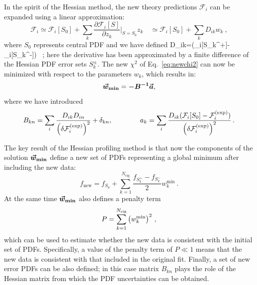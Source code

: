 In the spirit of the Hessian method, the new theory predictions $\mathcal{F}_i$ can be expanded
using a linear approximation:
\begin{equation}
\mathcal{F}_i \simeq \mathcal{F}_i[S_0] + \sum_k \frac{\partial\mathcal{F}_i[S]}{\partial z_k}\bigg|_{S=S_0} z_k \quad
              \simeq \mathcal{F}_i[S_0] + \sum_k D_{ik} w_k \ ,
\end{equation}
where $S_0$ represents central PDF and we have defined
\be
D_{ik}=(_i[S_k^+]-_i[S_k^-]) \, ;
\ee
here the  derivative has been approximated by a finite difference of the 
Hessian PDF error sets $S_k^{\pm}$.
%
The new $\chi^2$ of Eq.~\eqref{eq:newchi2} can now be minimized with respect to the parameters $w_k$,
which results in:
\begin{equation}
\boldsymbol{\vec{w}_{\text{{\bf min}}}} = \boldsymbol{-B^{-1}} \boldsymbol{\vec{a}},
\end{equation}
where we have introduced
\begin{equation}
B_{kn} = \sum_i {{D_{ik}D_{in}}\over {\left(\delta\mathcal{F}_i^{\rm(exp)}\right)^2}} + \delta_{kn},
\qquad
\qquad
a_k = \sum_i {{D_{ik}(\mathcal{F}_i[S_0] - \mathcal{F}_i^{\rm(exp)})}\over {\left(\delta\mathcal{F}_i^{\rm(exp)}\right)^2}} \, . 
\end{equation}

The key result of the Hessian profiling method
is that now the components of the solution $\boldsymbol{\vec{w}_{\text{{\bf min}}}}$ define a new set
of PDFs representing a global minimum after including the new data:
\begin{equation}
f_{\text{new}} = f_{S_0} + \sum_{k=1}^{N_{\text{eig}}} \frac{f_{S_k^+}-f_{S_k^-}}{2} w_k^{\text{min}} \ .
\end{equation}
At the same time $\boldsymbol{\vec{w}_{\text{{\bf min}}}}$ also  defines  a penalty term 
\begin{equation}
P = \sum_{k=1}^{N_{\text{eig}}} \left( w_k^{\text{min}} \right)^2 \, ,
\end{equation}
which can be used to estimate whether the new data is consistent with the initial set of PDFs.
%
Specifically, a value of
the penalty term of $P\ll1$ means that the new data is consistent
with that included in the original fit.
%
Finally, a set of new error PDFs can be also defined; in this case matrix $B_{kn}$ plays the role of
the Hessian matrix from which the PDF uncertainties
can be obtained. 

